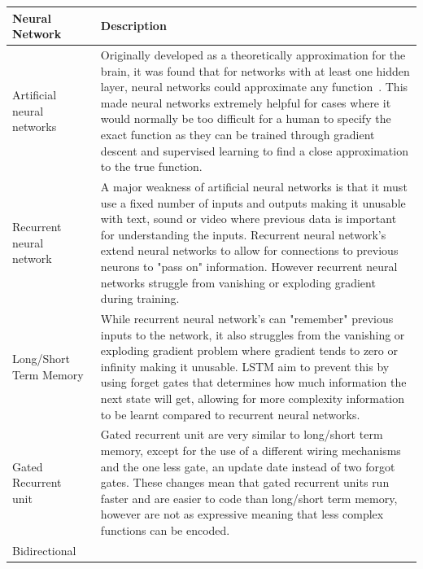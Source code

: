 \begin{longtable}{|p{3.5cm}|p{10cm}|} \hline
    \textbf{Neural Network} & \textbf{Description} \\ \hline
    Artificial neural networks~\citep{ANN} & Originally developed as a theoretically approximation for the brain, it
        was found that for networks with at least one hidden layer, neural networks could approximate any
        function~\citep{csaji2001approximation}. This made neural networks extremely helpful for cases where it would
        normally be too difficult for a human to specify the exact function as they can be trained through gradient
        descent and supervised learning to find a close approximation to the true function. \\ \hline

    Recurrent neural network~\citep{RNN} & A major weakness of artificial neural networks is that it must use a fixed
        number of inputs and outputs making it unusable with text, sound or video where previous data is important
        for understanding the inputs. Recurrent neural network's extend neural networks to allow for connections to
        previous neurons to "pass on" information. However recurrent neural networks struggle from vanishing or
        exploding gradient during training. \\ \hline

    Long/Short Term Memory~\citep{LSTM} & While recurrent neural network's can "remember" previous inputs to the
        network, it also struggles from the vanishing or exploding gradient problem where gradient tends to zero or
        infinity making it unusable. LSTM aim to prevent this by using forget gates that determines how much
        information the next state will get, allowing for more complexity information to be learnt compared to
        recurrent neural networks. \\ \hline

    Gated Recurrent unit~\citep{GRU} & Gated recurrent unit are very similar to long/short term memory, except for the
        use of a different wiring mechanisms and the one less gate, an update date instead of two forgot gates.
        These changes mean that gated recurrent units run faster and are easier to code than long/short term memory,
        however are not as expressive meaning that less complex functions can be encoded. \\ \hline

    Bidirectional~\citep{Bidirectional} & %
        \\ \hline


\end{longtable}
